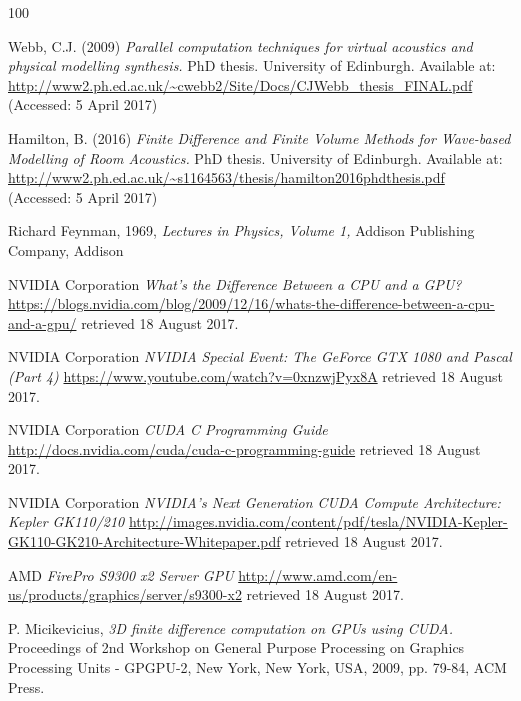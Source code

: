 \documentclass[12pt,a4paper]{report}
\begin{document}

\begin{thebibliography}{100}

Webb, C.J. (2009) \emph{Parallel computation techniques for virtual
acoustics and physical modelling synthesis.} PhD thesis. University of Edinburgh. Available at: \url{http://www2.ph.ed.ac.uk/~cwebb2/Site/Docs/CJWebb_thesis_FINAL.pdf} (Accessed: 5 April 2017)

Hamilton, B. (2016) \emph{Finite Difference and Finite Volume Methods for
Wave-based Modelling of Room Acoustics.} PhD thesis. University of Edinburgh. Available at: \url{http://www2.ph.ed.ac.uk/~s1164563/thesis/hamilton2016phdthesis.pdf} (Accessed: 5 April 2017)

Richard Feynman,  1969, 
\textit{Lectures in Physics, Volume 1,}
Addison Publishing Company, Addison


 NVIDIA Corporation {\em What's the Difference Between a CPU and a GPU?} \url{https://blogs.nvidia.com/blog/2009/12/16/whats-the-difference-between-a-cpu-and-a-gpu/} retrieved 18 August 2017.

 NVIDIA Corporation {\em NVIDIA Special Event: The GeForce GTX 1080 and Pascal (Part 4)} \url{https://www.youtube.com/watch?v=0xnzwjPyx8A} retrieved 18 August 2017.

 NVIDIA Corporation {\em CUDA C Programming Guide} \url{http://docs.nvidia.com/cuda/cuda-c-programming-guide} retrieved 18 August 2017.

 NVIDIA Corporation {\em NVIDIA's Next Generation CUDA Compute Architecture: Kepler GK110/210} \url{http://images.nvidia.com/content/pdf/tesla/NVIDIA-Kepler-GK110-GK210-Architecture-Whitepaper.pdf} retrieved 18 August 2017.

 AMD {\em FirePro S9300 x2 Server GPU} \url{http://www.amd.com/en-us/products/graphics/server/s9300-x2} retrieved 18 August 2017.

 P. Micikevicius, \emph{3D finite difference computation on GPUs using CUDA.} Proceedings of 2nd Workshop on General Purpose Processing on Graphics Processing Units - GPGPU-2, New York, New York, USA, 2009, pp. 79-84, ACM Press.


\end{thebibliography}
\end{document}
